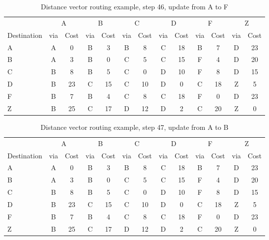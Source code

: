 \begin{table}
    \caption{Distance vector  routing example, step 46, update from A to F }
    \label{tab:dv:step:46}
\begin{tabular}{l|c|c|c|c|c|c|c|c|c|c|c|c}
    \toprule
      & \multicolumn{2}{c|}{A}&\multicolumn{2}{c|}{B}&\multicolumn{2}{c|}{C}&\multicolumn{2}{c|}{D}&\multicolumn{2}{c|}{F}&\multicolumn{2}{c|}{Z} \\
    Destination & via&Cost&via&Cost&via&Cost&via&Cost&via&Cost&via&Cost \\ 
    \midrule
    A & A & 0 &B & 3 &B & 8 &C & 18 &B & 7 &D & 23 
 \\B & A & 3 &B & 0 &C & 5 &C & 15 &F & 4 &D & 20 
 \\C & B & 8 &B & 5 &C & 0 &D & 10 &F & 8 &D & 15 
 \\D & B & 23 &C & 15 &C & 10 &D & 0 &C & 18 &Z & 5 
 \\F & B & 7 &B & 4 &C & 8 &C & 18 &F & 0 &D & 23 
 \\Z & B & 25 &C & 17 &D & 12 &D & 2 &C & 20 &Z & 0 
    \\ \bottomrule 
\end{tabular}
\end{table}
    

\begin{table}
    \caption{Distance vector  routing example, step 47, update from A to B }
    \label{tab:dv:step:47}
\begin{tabular}{l|c|c|c|c|c|c|c|c|c|c|c|c}
    \toprule
      & \multicolumn{2}{c|}{A}&\multicolumn{2}{c|}{B}&\multicolumn{2}{c|}{C}&\multicolumn{2}{c|}{D}&\multicolumn{2}{c|}{F}&\multicolumn{2}{c|}{Z} \\
    Destination & via&Cost&via&Cost&via&Cost&via&Cost&via&Cost&via&Cost \\ 
    \midrule
    A & A & 0 &B & 3 &B & 8 &C & 18 &B & 7 &D & 23 
 \\B & A & 3 &B & 0 &C & 5 &C & 15 &F & 4 &D & 20 
 \\C & B & 8 &B & 5 &C & 0 &D & 10 &F & 8 &D & 15 
 \\D & B & 23 &C & 15 &C & 10 &D & 0 &C & 18 &Z & 5 
 \\F & B & 7 &B & 4 &C & 8 &C & 18 &F & 0 &D & 23 
 \\Z & B & 25 &C & 17 &D & 12 &D & 2 &C & 20 &Z & 0 
    \\ \bottomrule 
\end{tabular}
\end{table}
    

